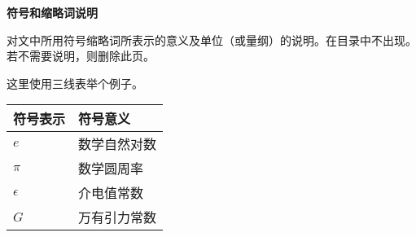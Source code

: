 \begin{center}
    \heiti\sanhao\bfseries{符号和缩略词说明}
    \vspace{1cm}
\end{center}

对文中所用符号缩略词所表示的意义及单位（或量纲）的说明。在目录中不出现。若不需要说明，则删除此页。

这里使用三线表举个例子。
\begin{table}[hbpt]
    \centering
    \linespread{1.2}
    \begin{tabular}{p{}<{\centering}p{}<{\centering}}
        \toprule[1.5pt]
        符号表示 & 符号意义\\
        \midrule[1pt]
        $e$& 数学自然对数\\
        $\pi$& 数学圆周率\\
        $\epsilon$ & 介电值常数\\
        $G$ & 万有引力常数\\
        \bottomrule[1.5pt]
    \end{tabular}
\end{table}
\newpage
%

